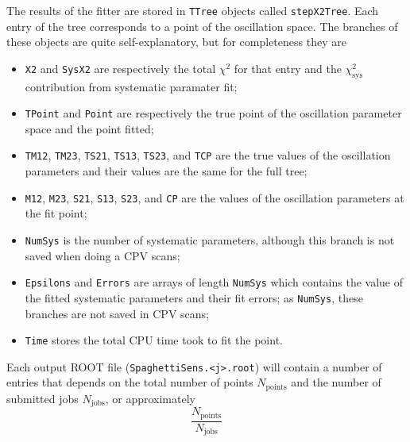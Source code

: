 \documentclass[a4paper, 11pt]{article}
\begin{document}
The results of the fitter are stored in \texttt{TTree} objects called \texttt{stepX2Tree}.
Each entry of the tree corresponds to a point of the oscillation space.
The branches of these objects are quite self-explanatory, but for completeness they are
\begin{itemize}
	\item \texttt{X2} and \texttt{SysX2} are respectively the total $\chi^2$ for that entry %
		and the $\chi^2_\text{sys}$ contribution from systematic paramater fit;
	\item \texttt{TPoint} and \texttt{Point} are respectively the true point of the oscillation %
		parameter space and the point fitted;
	\item \texttt{TM12}, \texttt{TM23}, \texttt{TS21}, \texttt{TS13}, \texttt{TS23}, and \texttt{TCP} %
		are the true values of the oscillation parameters and their values are the same %
		for the full tree; %
	\item \texttt{M12}, \texttt{M23}, \texttt{S21}, \texttt{S13}, \texttt{S23}, and \texttt{CP} %
		are the values of the oscillation parameters at the fit point;
	\item \texttt{NumSys} is the number of systematic parameters, although this branch is not %
		saved when doing a CPV scans;
	\item \texttt{Epsilons} and \texttt{Errors} are arrays of length \texttt{NumSys} %
		which contains the value of the fitted systematic parameters and their fit errors;
		as \texttt{NumSys}, these branches are not saved in CPV scans;
	\item \texttt{Time} stores the total CPU time took to fit the point.
\end{itemize}
Each output ROOT file (\texttt{SpaghettiSens.<j>.root}) will contain a number of entries %
that depends on the total number of points $N_\text{points}$ and the number of submitted %
jobs $N_\text{jobs}$, or approximately
\[
	\frac{N_\text{points}}{N_\text{jobs}}
\]
\end{document}
